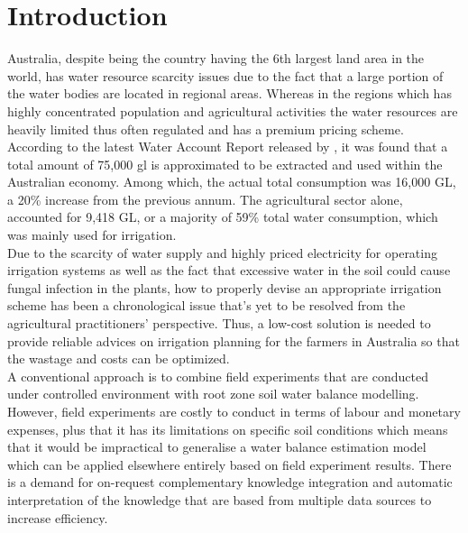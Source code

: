 
\chapter{Introduction} %

\label{ch:introduction} %
Australia, despite being the country having the 6th largest land area in the world, has water resource scarcity issues due to the fact that a large portion of the water bodies are located in regional areas. Whereas in the regions which has highly concentrated population and agricultural activities the water resources are heavily limited thus often regulated and  
has a premium pricing scheme. According to the latest Water Account Report released by \citet{Statistics2013}, it was found that a total amount of 75,000 \ac{gl} is approximated to be extracted and used within the Australian economy. Among which, the actual total consumption was 16,000 GL, a 20\% increase from the previous annum. The agricultural sector alone, accounted for 9,418 GL, or a majority of 59\% total water consumption, which was mainly used for irrigation.\\
\newline 
Due to the scarcity of water supply and highly priced electricity for operating irrigation systems as well as the fact that excessive water in the soil could cause fungal infection in the plants\citep{Wong1984}, how to properly devise an appropriate irrigation scheme has been a chronological issue that's yet to be resolved from the agricultural practitioners' perspective. Thus, a low-cost solution is needed to provide reliable advices on irrigation planning for the farmers in Australia so that the wastage and costs can be optimized.\\
\newline
A conventional approach is to combine field experiments that are conducted under controlled environment with root zone soil water balance modelling. However, field experiments are costly to conduct in terms of labour and monetary expenses, plus that it has its limitations on specific soil conditions which means that it would be impractical to generalise a water balance estimation model which can be applied elsewhere entirely based on field experiment results. There is a demand for on-request complementary knowledge integration and automatic interpretation of the knowledge that are based from multiple data sources to increase efficiency. \\

